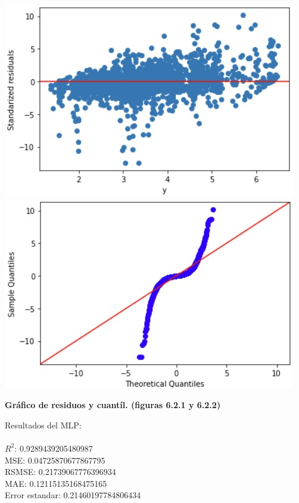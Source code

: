 \documentclass{article}
\begin{document}
                        \includegraphics[scale=0.6]{images/RFR_Stage_DS.jpg} 
                        \includegraphics[scale=0.6]{images/RFR_Stage_DS_Q.jpg} \\
                        \begin{center}
                            \textbf{Gráfico de residuos y cuantíl. (figuras 6.2.1 y 6.2.2)}
                        \end{center}
            
            Resultados del MLP:\\
                    \\  
                        $R^2$:  0.9289439205480987 \\
                        MSE:  0.04725870677867795 \\
                        RSMSE:  0.21739067776396934 \\
                        MAE:  0.12115135168475165 \\
                        Error estandar:  0.21460197784806434 \\
                
\end{document}
